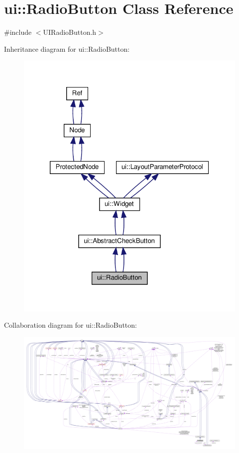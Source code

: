 \hypertarget{classui_1_1RadioButton}{}\section{ui\+:\+:Radio\+Button Class Reference}
\label{classui_1_1RadioButton}


{\ttfamily \#include $<$U\+I\+Radio\+Button.\+h$>$}



Inheritance diagram for ui\+:\+:Radio\+Button\+:
\nopagebreak
\begin{figure}[H]
\begin{center}
\leavevmode
\includegraphics[width=320pt]{classui_1_1RadioButton__inherit__graph}
\end{center}
\end{figure}


Collaboration diagram for ui\+:\+:Radio\+Button\+:
\nopagebreak
\begin{figure}[H]
\begin{center}
\leavevmode
\includegraphics[width=350pt]{classui_1_1RadioButton__coll__graph}
\end{center}
\end{figure}
